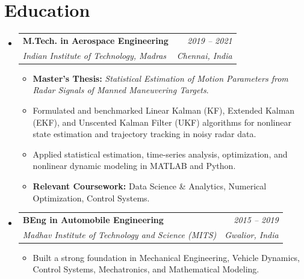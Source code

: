 
\section{Education}
\vspace{2pt}
\begin{itemize}[leftmargin=0.15in, label={}] 
  \small\item{
    \begin{tabularx}{0.97\textwidth}{@{}X r@{}}
      \textbf{M.Tech. in Aerospace Engineering} & {\color{gray}\textit{\small 2019 -- 2021}} \\
      \textit{Indian Institute of Technology, Madras} & {\color{gray}\textit{\small Chennai, India}}
    \end{tabularx}
    \begin{itemize}[leftmargin=0.2in]
      \item \small{\textbf{Master's Thesis:} \textit{Statistical Estimation of Motion Parameters from Radar Signals of Manned Maneuvering Targets}.}
      \item \small{Formulated and benchmarked Linear Kalman (KF), Extended Kalman (EKF), and Unscented Kalman Filter (UKF) algorithms for nonlinear state estimation and trajectory tracking in noisy radar data.}
      \item \small{Applied statistical estimation, time-series analysis, optimization, and nonlinear dynamic modeling in MATLAB and Python.}
      \item \small{\textbf{Relevant Coursework:} Data Science \& Analytics, Numerical Optimization, Control Systems.}
    \end{itemize}
  }

  \small\item{
    \begin{tabularx}{0.97\textwidth}{@{}X r@{}}
      \textbf{BEng in Automobile Engineering} & {\color{gray}\textit{\small 2015 -- 2019}} \\
      \textit{Madhav Institute of Technology and Science (MITS)} & {\color{gray}\textit{\small Gwalior, India}}
    \end{tabularx}
    \begin{itemize}[leftmargin=0.2in]
      \item \small{Built a strong foundation in Mechanical Engineering, Vehicle Dynamics, Control Systems, Mechatronics, and Mathematical Modeling.}
    \end{itemize}
  }
\end{itemize}

